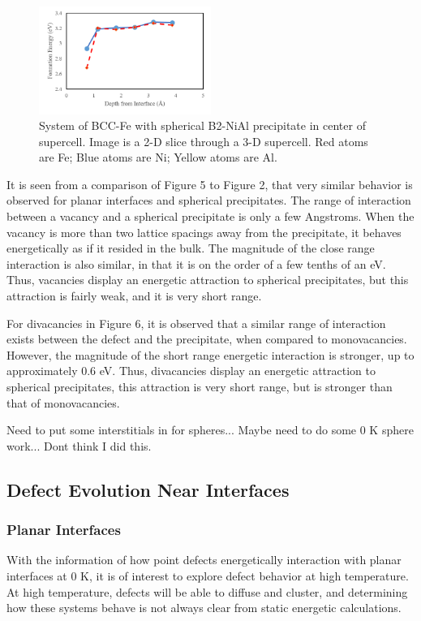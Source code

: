 \documentclass[review]{elsarticle}
\begin{document}
\begin{figure}[htp]
   \centering
   \includegraphics[width=0.5\textwidth]{divac_sphere.png} 
   \caption{System of BCC-Fe with spherical B2-NiAl precipitate in center of supercell.  Image is a 2-D slice through a 3-D supercell.  Red atoms are Fe; Blue atoms are Ni; Yellow atoms are Al.}
   \label{fig:example}
\end{figure}

It is seen from a comparison of Figure 5 to Figure 2, that very similar behavior is observed for planar interfaces and spherical precipitates.  The range of interaction between a vacancy and a spherical precipitate is only a few Angstroms.  When the vacancy is more than two lattice spacings away from the precipitate, it behaves energetically as if it resided in the bulk.  The magnitude of the close range interaction is also similar, in that it is on the order of a few tenths of an eV.  Thus, vacancies display an energetic attraction to spherical precipitates, but this attraction is fairly weak, and it is very short range.

For divacancies in Figure 6, it is observed that a similar range of interaction exists between the defect and the precipitate, when compared to monovacancies.  However, the magnitude of the short range energetic interaction is stronger, up to approximately 0.6 eV.  Thus, divacancies display an energetic attraction to spherical precipitates, this attraction is very short range, but is stronger than that of monovacancies.

Need to put some interstitials in for spheres... Maybe need to do some 0 K sphere work... Dont think I did this.

\FloatBarrier

\subsection{Defect Evolution Near Interfaces}
\subsubsection{Planar Interfaces}
With the information of how point defects energetically interaction with planar interfaces at 0 K, it is of interest to explore defect behavior at high temperature.  At high temperature, defects will be able to diffuse and cluster, and determining how these systems behave is not always clear from static energetic calculations.  
\end{document}
